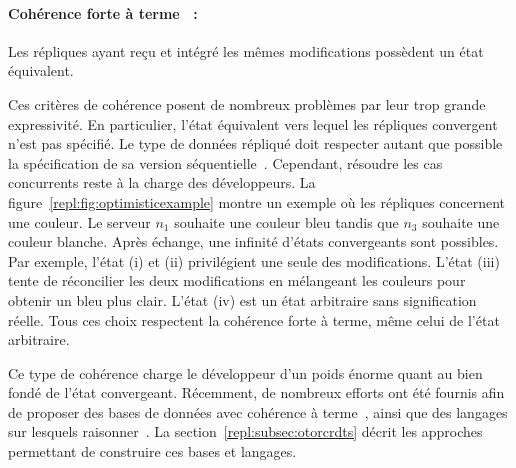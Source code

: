 \paragraph{Cohérence forte à terme~\cite{shapiro2011conflict} :} Les répliques
ayant reçu et intégré les mêmes modifications possèdent un état équivalent.


\begin{figure*}
  \centering
  \hspace{10pt}
  \caption[Convergence en réplication optimiste]
  {\label{repl:fig:optimisticexample} Exemple de réplication optimiste avec
    modifications concurrentes.}
\end{figure*}


Ces critères de cohérence posent de nombreux problèmes par leur trop grande
expressivité. En particulier, l'état équivalent vers lequel les répliques
convergent n'est pas spécifié. Le type de données répliqué doit respecter autant
que possible la spécification de sa version
séquentielle~\cite{bieniusa2012brief}. Cependant, résoudre les cas concurrents
reste à la charge des développeurs. La figure~\ref{repl:fig:optimisticexample}
montre un exemple où les répliques concernent une couleur. Le serveur $n_1$
souhaite une couleur bleu tandis que $n_3$ souhaite une couleur blanche. Après
échange, une infinité d'états convergeants sont possibles. Par exemple, l'état
(i) et (ii) privilégient une seule des modifications. L'état (iii) tente de
réconcilier les deux modifications en mélangeant les couleurs pour obtenir un
bleu plus clair. L'état (iv) est un état arbitraire sans signification
réelle. Tous ces choix respectent la cohérence forte à terme, même celui de
l'état arbitraire.

Ce type de cohérence charge le développeur d'un poids énorme quant au bien fondé
de l'état convergeant.  Récemment, de nombreux efforts ont été fournis afin de
proposer des bases de données avec cohérence à terme~\cite{dynamo, riak,
  cassandra, mongodb}, ainsi que des langages sur lesquels
raisonner~\cite{conway2012logic, meiklejohn2015lasp}. La
section~\ref{repl:subsec:otorcrdts} décrit les approches permettant de
construire ces bases et langages.


